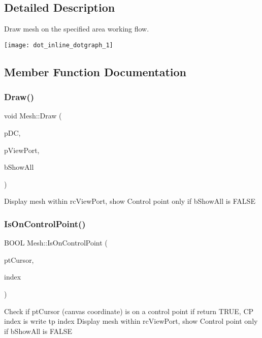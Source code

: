 \subsection{Detailed Description}
Draw mesh on the specified area working flow. 


\begin{DoxyImageNoCaption}
  \mbox{\texttt{[image: dot\_inline\_dotgraph\_1]}}
\end{DoxyImageNoCaption}
 

\subsection{Member Function Documentation}
\mbox{\label{class_mesh_ab55d4ba1fb6a9e49651dc4801392df6d}} 
\subsubsection{\texorpdfstring{Draw()}{Draw()}}
{\footnotesize\ttfamily void Mesh\+::\+Draw (\begin{DoxyParamCaption}\item[{C\+DC $\ast$}]{p\+DC,  }\item[{R\+E\+CT $\ast$}]{p\+View\+Port,  }\item[{B\+O\+OL}]{b\+Show\+All }\end{DoxyParamCaption})}

Display mesh within rc\+View\+Port, show Control point only if b\+Show\+All is F\+A\+L\+SE \mbox{\label{class_mesh_a945caa648924bf3336a54c075b83e019}} 
\subsubsection{\texorpdfstring{Is\+On\+Control\+Point()}{IsOnControlPoint()}}
{\footnotesize\ttfamily B\+O\+OL Mesh\+::\+Is\+On\+Control\+Point (\begin{DoxyParamCaption}\item[{P\+O\+I\+NT}]{pt\+Cursor,  }\item[{P\+O\+I\+NT \&}]{index }\end{DoxyParamCaption})}

Check if pt\+Cursor (canvas coordinate) is on a control point if return T\+R\+UE, CP index is write tp index Display mesh within rc\+View\+Port, show Control point only if b\+Show\+All is F\+A\+L\+SE \mbox{\label{class_mesh_a40ac4b15e3c738aab4c701d774e65ce9}} 
